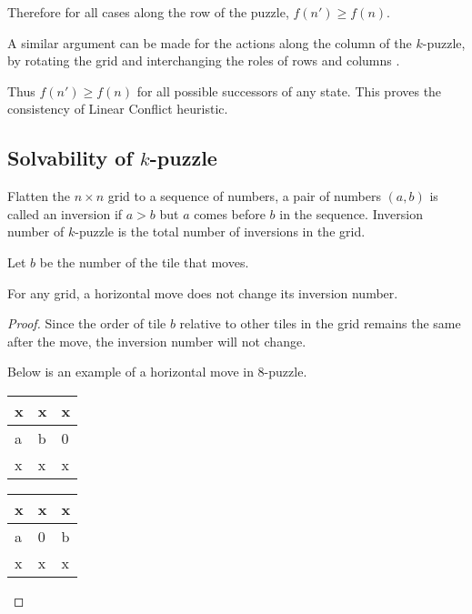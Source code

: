 \documentclass{llncs}
\begin{document}
Therefore for all cases along the row of the puzzle, $f(n') \geq f(n)$. 

A similar argument can be made for the actions along the column of the $k$-puzzle, by rotating the grid and interchanging the roles of rows and columns .

Thus $f(n') \geq f(n)$ for all possible successors of any state. This proves the consistency of Linear Conflict heuristic.

\subsection{Solvability of $k$-puzzle~\cite{solvable}}
\begin{definition}
Flatten the $n \times n$ grid to a sequence of numbers, a pair of numbers $(a,b)$ is called an inversion if $a>b$ but $a$ comes before $b$ in the sequence. Inversion number of $k$-puzzle is the total number of inversions in the grid.
\end{definition}

Let $b$ be the number of the tile that moves.

\begin{lemma}
For any grid, a horizontal move does not change its inversion number.
\end{lemma}

\begin{proof}
Since the order of tile $b$ relative to other tiles in the grid remains the same after the move, the inversion number will not change.

Below is an example of a horizontal move in $8$-puzzle.
\begin{table}
	\centering
	\label{tab1}
	\begin{tabular}{|p{2mm}|p{2mm}|p{2mm}|} \hline
	x & x & x\\ \hline
	a & b & 0\\ \hline
	x & x & x\\ \hline
	\end{tabular}
\end{table}
\begin{table}
	\centering
	\label{tab2}
	\begin{tabular}{|p{2mm}|p{2mm}|p{2mm}|} \hline
	x & x & x\\ \hline
	a & 0 & b\\ \hline
	x & x & x\\ \hline
	\end{tabular}
\end{table}
\end{proof}
\end{document}
